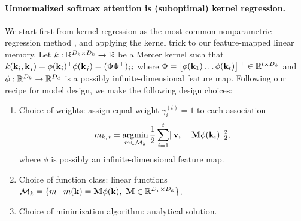 \documentclass[notitlepage, 11pt]{article}
\newcommand*{\memory}{{m}}
\newcommand*{\dkey}{{D_k}}
\newcommand*{\dphi}{{D_\phi}}
\newcommand*{\dval}{{D_v}}
\begin{document}
\paragraph{Unnormalized softmax attention is (suboptimal) kernel regression.}
We start first from kernel regression as the most common nonparametric regression method \citep{Scholkopf2001LearningKernelsSupport}, and applying the kernel trick to our feature-mapped linear memory.
Let $k:\reals^{\dkey\times \dkey} \to \reals$ be a Mercer kernel such that $k(\mathbf{k}_i, \mathbf{k}_j) = \phi(\mathbf{k}_i){}^\top\phi(\mathbf{k}_j) = (\Phi\Phi{}^\top)_{ij}$ where $\Phi = \bmat{\phi(\kbf_1) \ldots \phi(\kbf_t)}\transpose \in \reals^{t\times \dphi}$ and $\phi: \reals^\dkey\to \reals^\dphi$ is a possibly  infinite-dimensional feature map.
Following our recipe for model design, we make the following design choices:
\begin{enumerate}
    \item Choice of weights: assign equal weight $\gamma_i^{(t)} = 1$ to each association  \begin{align}\memory_{k,\,t} = \argmin_{\memory\in \Mcal_k} \frac{1}{2}\sum_{i=1}^t \norm{\vbf_i - \Mbf \phi(\kbf_i)}_2^2,\end{align} where $\phi$ is possibly an infinite-dimensional feature map.
    \item Choice of function class: linear functions $\Mcal_{k}= \{\memory\mid \memory(\kbf) = \Mbf \phi(\kbf),\ \Mbf \in \reals^{\dval\times\dphi}\}$.
    \item Choice of minimization algorithm: analytical solution.
\end{enumerate}
\end{document}
